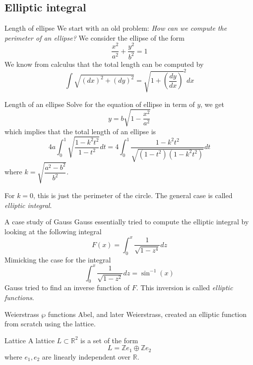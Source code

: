 \documentclass[pdf]{beamer}
\begin{document}
\subsection{Elliptic integral}
\begin{frame}{Length of ellipse}
    We start with an old problem: \textit{How can we compute the perimeter of an ellipse?}
    \pause
    We consider the ellipse of the form
    \[\dfrac{x^2}{a^2}+\dfrac{y^2}{b^2}=1\]
    We know from calculus that the total length can be computed by
    \[\int\sqrt{(dx)^2+(dy)^2}= \sqrt{1+\left(\dfrac{dy}{dx}\right)}^2dx \]
\end{frame}
\begin{frame}{Length of an ellipse}
    Solve for the equation of ellipse in term of $y$, we get
    \[y = b\sqrt{1-\frac{x^2}{a^2}}\]
    which implies that
    the total length of an ellipse is
    \[4a \int_0^1 \sqrt{\dfrac{1-k^2t^2}{1-t^2}}dt = 4\int_0^1 \dfrac{1-k^2t^2}{\sqrt{(1-t^2)(1-k^2t^2)}}dt \] \pause%
    where $k = \sqrt{\dfrac{a^2-b^2}{b^2}}$.

    For $k =0$, this is just the perimeter of the circle.  The general case is called \textit{elliptic integral}.

\end{frame}
\begin{frame}{A case study of Gauss}
    Gauss essentially tried to compute the elliptic integral by looking at the
    following integral
    \[F(x) = \displaystyle\int_0^x\dfrac{1}{\sqrt{1-z^4}}dz\]
    Mimicking the case for the integral
    \[ \int_0^x\dfrac{1}{\sqrt{1-z^2}}dz = \sin^{-1}(x)\]
    Gauss tried to find an inverse function of $F$. This inversion is called \textit{elliptic functions}.
\end{frame}
\begin{frame}{Weierstrass $\wp$ functions}
    Abel, and later Weierstrass, created an elliptic function from scratch using the lattice.
    \begin{block}{Lattice}
        A lattice $L \subset \mathbb{R}^2$ is a set of the form
        \[L = \mathbb{Z}e_1\oplus\mathbb{Z}e_2\]
        where $e_1,e_2$ are linearly independent over $\mathbb{R}$.
    \end{block}
\end{frame}
\end{document}
